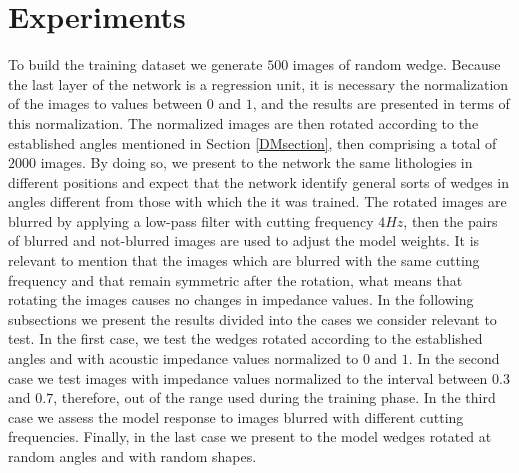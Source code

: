 \documentclass[conference]{IEEEtran}
\begin{document}
\section{Experiments}
To build the training dataset we generate $500$ images of random wedge.
Because the last layer of the network is a regression unit, it is necessary the
normalization of the images to values between $0$ and $1$, and the results
are presented in terms of this normalization.
The normalized images are then rotated according to the established angles mentioned in Section \ref{DMsection},
then comprising a total of $2000$ images. By doing so, we present to
the network the same lithologies in different positions and expect that the network
identify general sorts of wedges in angles different from those with which the it was trained.
The rotated images are blurred by applying a low-pass filter with
cutting frequency $4Hz$, then the pairs of blurred and not-blurred images are used to
adjust the model weights. It is relevant to mention that the images which are blurred with
the same cutting frequency and that remain symmetric after the rotation, what means that rotating the images causes no changes in impedance values.
In the following subsections we present the results divided into the cases we consider relevant to test. In the
first case, we test the wedges rotated according to the established angles and with acoustic impedance values normalized to $0$ and $1$.
In the second case we test images with impedance values normalized to the interval between $0.3$ and $0.7$, therefore, out of the range used during the training phase.
In the third case we assess the model response to images blurred with different cutting frequencies.
Finally, in the last case we present to the model wedges rotated at random angles and with random shapes.
\end{document}
